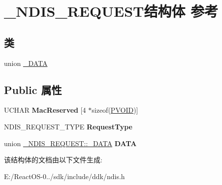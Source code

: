 \hypertarget{struct___n_d_i_s___r_e_q_u_e_s_t}{}\section{\+\_\+\+N\+D\+I\+S\+\_\+\+R\+E\+Q\+U\+E\+S\+T结构体 参考}
\label{struct___n_d_i_s___r_e_q_u_e_s_t}
\subsection*{类}
\begin{DoxyCompactItemize}
\item 
union \hyperlink{union___n_d_i_s___r_e_q_u_e_s_t_1_1___d_a_t_a}{\+\_\+\+D\+A\+TA}
\end{DoxyCompactItemize}
\subsection*{Public 属性}
\begin{DoxyCompactItemize}
\item 
\mbox{\label{struct___n_d_i_s___r_e_q_u_e_s_t_a68b02bbef47b5e7fbc9e1918f435ff37}} 
U\+C\+H\+AR {\bfseries Mac\+Reserved} \mbox{[}4 $\ast$sizeof(\hyperlink{interfacevoid}{P\+V\+O\+ID})\mbox{]}
\item 
\mbox{\label{struct___n_d_i_s___r_e_q_u_e_s_t_a1302d644abf169d7a7a1c37b110588ea}} 
N\+D\+I\+S\+\_\+\+R\+E\+Q\+U\+E\+S\+T\+\_\+\+T\+Y\+PE {\bfseries Request\+Type}
\item 
\mbox{\label{struct___n_d_i_s___r_e_q_u_e_s_t_aed0453a5e59b630b81b01bfac2755a4b}} 
union \hyperlink{union___n_d_i_s___r_e_q_u_e_s_t_1_1___d_a_t_a}{\+\_\+\+N\+D\+I\+S\+\_\+\+R\+E\+Q\+U\+E\+S\+T\+::\+\_\+\+D\+A\+TA} {\bfseries D\+A\+TA}
\end{DoxyCompactItemize}


该结构体的文档由以下文件生成\+:\begin{DoxyCompactItemize}
\item 
E\+:/\+React\+O\+S-\/0../sdk/include/ddk/ndis.\+h\end{DoxyCompactItemize}
